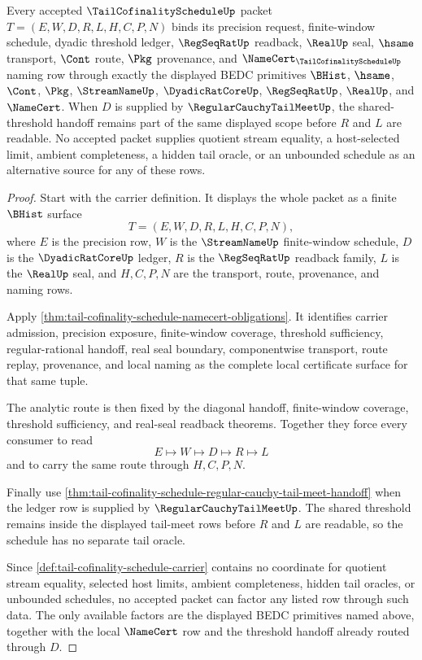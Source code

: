 \begin{theorem}
\label{thm:tail-cofinality-schedule-scoped-binding}
Every accepted $\TailCofinalityScheduleUp$ packet $T=(E,W,D,R,L,H,C,P,N)$ binds its precision request, finite-window schedule, dyadic threshold ledger, $\RegSeqRatUp$ readback, $\RealUp$ seal, $\hsame$ transport, $\Cont$ route, $\Pkg$ provenance, and $\NameCert_{\TailCofinalityScheduleUp}$ naming row through exactly the displayed BEDC primitives $\BHist$, $\hsame$, $\Cont$, $\Pkg$, $\StreamNameUp$, $\DyadicRatCoreUp$, $\RegSeqRatUp$, $\RealUp$, and $\NameCert$. When $D$ is supplied by $\RegularCauchyTailMeetUp$, the shared-threshold handoff remains part of the same displayed scope before $R$ and $L$ are readable. No accepted packet supplies quotient stream equality, a host-selected limit, ambient completeness, a hidden tail oracle, or an unbounded schedule as an alternative source for any of these rows.
\end{theorem}
\begin{proof}
Start with the carrier definition. It displays the whole packet as a finite $\BHist$ surface
$$
T=(E,W,D,R,L,H,C,P,N),
$$
where $E$ is the precision row, $W$ is the $\StreamNameUp$ finite-window schedule, $D$ is the $\DyadicRatCoreUp$ ledger, $R$ is the $\RegSeqRatUp$ readback family, $L$ is the $\RealUp$ seal, and $H,C,P,N$ are the transport, route, provenance, and naming rows.

Apply \autoref{thm:tail-cofinality-schedule-namecert-obligations}. It identifies carrier admission, precision exposure, finite-window coverage, threshold sufficiency, regular-rational handoff, real seal boundary, componentwise transport, route replay, provenance, and local naming as the complete local certificate surface for that same tuple.

The analytic route is then fixed by the diagonal handoff, finite-window coverage, threshold sufficiency, and real-seal readback theorems. Together they force every consumer to read
$$
E \longmapsto W \longmapsto D \longmapsto R \longmapsto L
$$
and to carry the same route through $H,C,P,N$.

Finally use \autoref{thm:tail-cofinality-schedule-regular-cauchy-tail-meet-handoff} when the ledger row is supplied by $\RegularCauchyTailMeetUp$. The shared threshold remains inside the displayed tail-meet rows before $R$ and $L$ are readable, so the schedule has no separate tail oracle.

Since \autoref{def:tail-cofinality-schedule-carrier} contains no coordinate for quotient stream equality, selected host limits, ambient completeness, hidden tail oracles, or unbounded schedules, no accepted packet can factor any listed row through such data. The only available factors are the displayed BEDC primitives named above, together with the local $\NameCert$ row and the threshold handoff already routed through $D$.
\end{proof}

